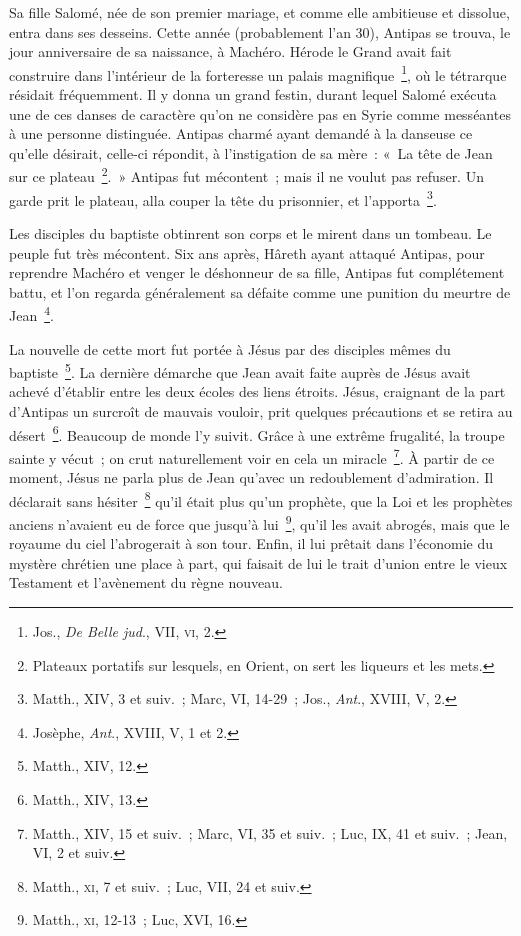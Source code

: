 \documentclass[french,twoside]{book} %
\begin{document}
Sa fille Salomé, née de son premier mariage, et comme elle ambitieuse et dissolue, entra dans ses desseins. Cette année (probablement l’an 30), Antipas se trouva, le jour anniversaire de sa naissance, à Machéro. Hérode le Grand avait fait construire dans l’intérieur de la forteresse un palais magnifique \footnote{ Jos., {\itshape De Belle jud}., VII, \textsc{vi}, 2.}, où le tétrarque résidait fréquemment. Il y donna un grand festin, durant lequel Salomé exécuta une de ces danses de caractère qu’on ne considère pas en Syrie comme messéantes à une personne distinguée. Antipas charmé ayant demandé à la danseuse ce qu’elle désirait, celle-ci répondit, à l’instigation de sa mère : « La tête de Jean sur ce plateau \footnote{Plateaux portatifs sur lesquels, en Orient, on sert les liqueurs et les mets.}. » Antipas fut mécontent ; mais il ne voulut pas refuser. Un garde prit le plateau, alla couper la tête du prisonnier, et l’apporta \footnote{ Matth., XIV, 3 et suiv. ; Marc, VI, 14-29 ; Jos., {\itshape Ant}., XVIII, V, 2.}.\par
Les disciples du baptiste obtinrent son corps et le mirent dans un tombeau. Le peuple fut très mécontent. Six ans après, Hâreth ayant attaqué Antipas, pour reprendre Machéro et venger le déshonneur de sa fille, Antipas fut complétement battu, et l’on regarda généralement sa défaite comme une punition du meurtre de Jean \footnote{ Josèphe, {\itshape Ant}., XVIII, V, 1 et 2.}.\par
La nouvelle de cette mort fut portée à Jésus par des disciples mêmes du baptiste \footnote{Matth., XIV, 12.}. La dernière démarche que Jean avait faite auprès de Jésus avait achevé d’établir entre les deux écoles des liens étroits. Jésus, craignant de la part d’Antipas un surcroît de mauvais vouloir, prit quelques précautions et se retira au désert \footnote{Matth., XIV, 13.}. Beaucoup de monde l’y suivit. Grâce à une extrême frugalité, la troupe sainte y vécut ; on crut naturellement voir en cela un miracle \footnote{Matth., XIV, 15 et suiv. ; Marc, VI, 35 et suiv. ; Luc, IX, 41 et suiv. ; Jean, VI, 2 et suiv.}. À partir de ce moment, Jésus ne parla plus de Jean qu’avec un redoublement d’admiration. Il déclarait sans hésiter \footnote{ Matth., \textsc{xi}, 7 et suiv. ; Luc, VII, 24 et suiv.} qu’il était plus qu’un prophète, que la Loi et les prophètes anciens n’avaient eu de force que jusqu’à lui \footnote{ Matth., \textsc{xi}, 12-13 ; Luc, XVI, 16.}, qu’il les avait abrogés, mais que le royaume du ciel l’abrogerait à son tour. Enfin, il lui prêtait dans l’économie du mystère chrétien une place à part, qui faisait de lui le trait d’union entre le vieux Testament et l’avènement du règne nouveau.\par
\end{document}
